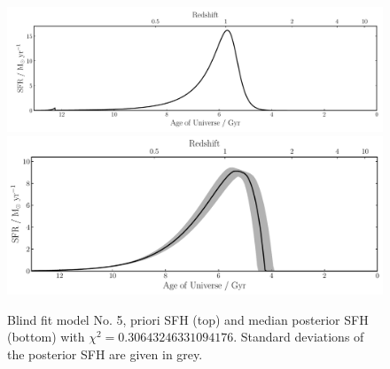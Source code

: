 \documentclass[a4paper,12pt]{article}
\begin{document}
\begin{figure}[h]
  \includegraphics[width=\textwidth]{../pipes/plots/r0_priors/phil_model_5_sfh}
  \includegraphics[width=\textwidth]{../pipes/plots/r4_delayed_burst/phil_model_5_sfh}
  \caption{
  Blind fit model No. 5, priori SFH (top) and median posterior SFH (bottom)
  with $\chi^2=0.30643246331094176$. Standard deviations of the posterior SFH
  are given in grey.
  }
  \label{fig:phil_model_5_sfhs}
\end{figure}


%
\end{document}
